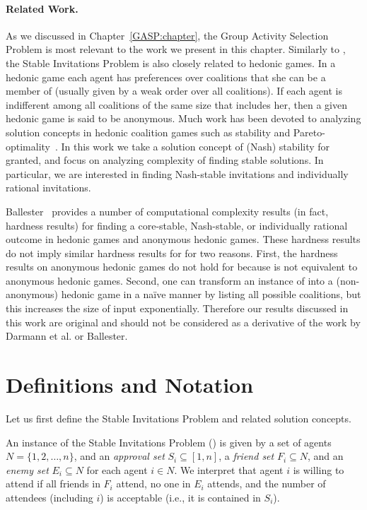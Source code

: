 \paragraph{Related Work.}
As we discussed in Chapter~\ref{GASP:chapter}, the Group Activity Selection Problem is most relevant to the work we present in this chapter. Similarly to \GASP, the Stable Invitations Problem is also closely related to hedonic games. In a hedonic game each agent has preferences over coalitions that she can be a member of (usually given by a weak order over all coalitions). If each agent is indifferent among all coalitions of the same size that includes her, then a given hedonic game is said to be anonymous. Much work has been devoted to analyzing solution concepts in hedonic coalition games such as stability and Pareto-optimality~\cite{BogomolnaiaJackson,DrezeGreenberg,AzizBrandl}.
In this work we take a solution concept of (Nash) stability for granted, and focus on analyzing complexity of finding stable solutions. In particular, we are interested in finding Nash-stable invitations and individually rational 
invitations. 

Ballester~\cite{NP_hedonic} provides a number of computational complexity 
results (in fact, hardness results) for finding a core-stable, Nash-stable, or 
individually rational outcome in hedonic games and anonymous hedonic games. These hardness results do not imply similar hardness results for \SIPs for two reasons.  First, the hardness results on anonymous hedonic games do not hold for \SIPs because \SIPs is not equivalent to anonymous hedonic games. Second, one can transform an instance of \SIPs into a (non-anonymous) hedonic game 
in a na\"{i}ve manner by listing all possible coalitions, but this increases 
the size of input exponentially. Therefore our results discussed in this work 
are original and should not be considered as a derivative of the work 
by Darmann et al. or Ballester.




\section{Definitions and Notation} \label{SIP:sec:SIP:prelim}

Let us first define the Stable Invitations Problem and related solution concepts. 

\begin{definition} \label{SIP:def:instance}
An instance of the Stable Invitations Problem (\SIP) is given by a set of agents $N = \{1, 2, \dots, n\}$, and an {\em approval set} $S_i \subseteq [1,n]$, a {\em friend set} $F_i \subseteq N$, and an {\em enemy set} $E_i \subseteq N$ for each agent $i\in N$.
We interpret that agent $i$ is willing to attend if all friends in $F_i$ attend, no one in $E_i$ attends, and the number of attendees (including $i$) is acceptable (i.e., it is contained in $S_i$).
\end{definition}


